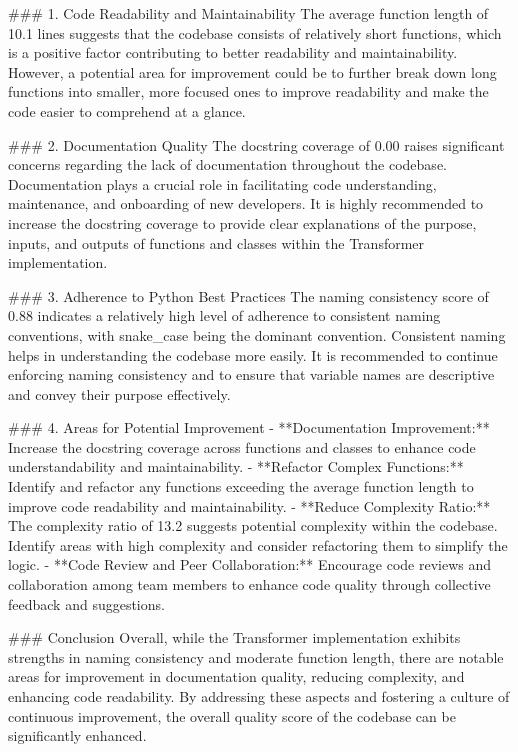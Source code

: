 \documentclass[10pt,journal,compsoc]{IEEEtran}
\begin{document}
### 1. Code Readability and Maintainability
The average function length of 10.1 lines suggests that the codebase consists of relatively short functions, which is a positive factor contributing to better readability and maintainability. However, a potential area for improvement could be to further break down long functions into smaller, more focused ones to improve readability and make the code easier to comprehend at a glance.

### 2. Documentation Quality
The docstring coverage of 0.00 raises significant concerns regarding the lack of documentation throughout the codebase. Documentation plays a crucial role in facilitating code understanding, maintenance, and onboarding of new developers. It is highly recommended to increase the docstring coverage to provide clear explanations of the purpose, inputs, and outputs of functions and classes within the Transformer implementation.

### 3. Adherence to Python Best Practices
The naming consistency score of 0.88 indicates a relatively high level of adherence to consistent naming conventions, with snake_case being the dominant convention. Consistent naming helps in understanding the codebase more easily. It is recommended to continue enforcing naming consistency and to ensure that variable names are descriptive and convey their purpose effectively.

### 4. Areas for Potential Improvement
- **Documentation Improvement:** Increase the docstring coverage across functions and classes to enhance code understandability and maintainability.
- **Refactor Complex Functions:** Identify and refactor any functions exceeding the average function length to improve code readability and maintainability.
- **Reduce Complexity Ratio:** The complexity ratio of 13.2 suggests potential complexity within the codebase. Identify areas with high complexity and consider refactoring them to simplify the logic.
- **Code Review and Peer Collaboration:** Encourage code reviews and collaboration among team members to enhance code quality through collective feedback and suggestions.

### Conclusion
Overall, while the Transformer implementation exhibits strengths in naming consistency and moderate function length, there are notable areas for improvement in documentation quality, reducing complexity, and enhancing code readability. By addressing these aspects and fostering a culture of continuous improvement, the overall quality score of the codebase can be significantly enhanced.
\end{document}
